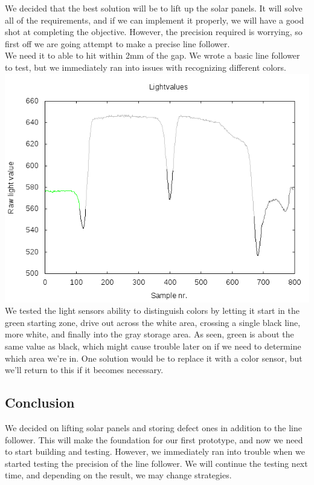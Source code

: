 We decided that the best solution will be to lift up the solar panels.
It will solve all of the requirements, and if we can implement it
properly, we will have a good shot at completing the objective. However,
the precision required is worrying, so first off we are going attempt to
make a precise line follower.\\
We need it to able to hit within 2mm of
the gap. We wrote a basic line follower to test, but we immediately ran
into issues with recognizing different
colors.
\center\includegraphics[scale=0.5]{../experiments/1prototype/results/gnuplot/GridAccuracy3cm_color.png}\\
We
tested the light sensors ability to distinguish colors by letting it
start in the green starting zone, drive out across the white area,
crossing a single black line, more white, and finally into the gray
storage area. As seen, green is about the same value as black, which
might cause trouble later on if we need to determine which area we're
in. One solution would be to replace it with a color sensor, but we'll
return to this if it becomes necessary.

\subsection{Conclusion}

We decided on lifting solar panels and storing defect ones in addition
to the line follower. This will make the foundation for our first
prototype, and now we need to start building and testing. However, we
immediately ran into trouble when we started testing the precision of
the line follower. We will continue the testing next time, and depending
on the result, we may change strategies.
